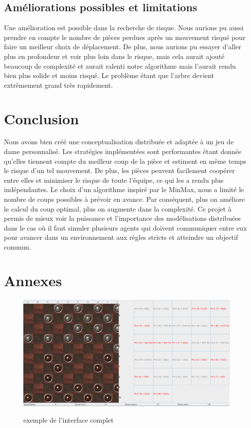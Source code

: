 \documentclass[11pt]{article} %
\begin{document}
\subsection{Améliorations possibles et limitations}
Une amélioration est possible dans la recherche de risque. Nous aurions pu aussi prendre en compte le nombre de pièces perdues après un mouvement risqué pour faire un meilleur choix de déplacement.
De plus, nous aurions pu essayer d'aller plus en profondeur et voir plus loin dans le risque, mais cela aurait ajouté beaucoup de complexité et aurait ralenti notre algorithme mais l'aurait rendu bien plus solide et moins risqué. Le problème étant que l'arbre devient extrêmement grand très rapidement.



\section{Conclusion}

Nous avons bien créé une conceptualisation distribuée et adaptée à un jeu de dame personnalisé. Les stratégies implémentées sont performantes étant donnée qu’elles tiennent compte du meilleur coup de la pièce et estiment en même temps le risque d’un tel mouvement. De plus, les pièces peuvent facilement coopérer entre elles et minimiser le risque de toute l’équipe, ce qui les a rendu plus indépendantes.
Le choix d’un algorithme inspiré par le MinMax, nous a limité le nombre de coups possibles à prévoir en avance. Par conséquent, plus on améliore le calcul du coup optimal, plus on augmente dans la complexité.
Ce projet à permis de mieux voir la puissance et l'importance des modélisations distribuées dans le cas où il faut simuler plusieurs agents qui doivent communiquer entre eux pour avancer dans un environnement aux règles stricts et atteindre un objectif commun.

\section{Annexes}
\begin{figure}[!ht]
\caption{exemple de l'interface complet}
\label{fig_sim}
\centering
{
\includegraphics[width=6in]{5}
\label{paysage}
}
\end{figure}



\end{document}
